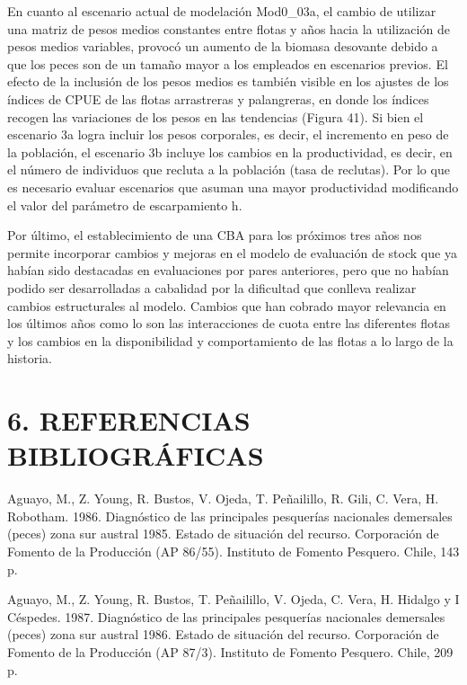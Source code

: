 \documentclass[
  spanish,
]{article}
\begin{document}
En cuanto al escenario actual de modelación Mod0\_03a, el cambio de
utilizar una matriz de pesos medios constantes entre flotas y años hacia
la utilización de pesos medios variables, provocó un aumento de la
biomasa desovante debido a que los peces son de un tamaño mayor a los
empleados en escenarios previos. El efecto de la inclusión de los pesos
medios es también visible en los ajustes de los índices de CPUE de las
flotas arrastreras y palangreras, en donde los índices recogen las
variaciones de los pesos en las tendencias (Figura 41). Si bien el
escenario 3a logra incluir los pesos corporales, es decir, el incremento
en peso de la población, el escenario 3b incluye los cambios en la
productividad, es decir, en el número de individuos que recluta a la
población (tasa de reclutas). Por lo que es necesario evaluar escenarios
que asuman una mayor productividad modificando el valor del parámetro de
escarpamiento h.

Por último, el establecimiento de una CBA para los próximos tres años
nos permite incorporar cambios y mejoras en el modelo de evaluación de
stock que ya habían sido destacadas en evaluaciones por pares
anteriores, pero que no habían podido ser desarrolladas a cabalidad por
la dificultad que conlleva realizar cambios estructurales al modelo.
Cambios que han cobrado mayor relevancia en los últimos años como lo son
las interacciones de cuota entre las diferentes flotas y los cambios en
la disponibilidad y comportamiento de las flotas a lo largo de la
historia.\\
\pagebreak

\hypertarget{referencias-bibliogruxe1ficas}{%
\section{6. REFERENCIAS
BIBLIOGRÁFICAS}\label{referencias-bibliogruxe1ficas}}

Aguayo, M., Z. Young, R. Bustos, V. Ojeda, T. Peñailillo, R. Gili, C.
Vera, H. Robotham. 1986. Diagnóstico de las principales pesquerías
nacionales demersales (peces) zona sur austral 1985. Estado de situación
del recurso. Corporación de Fomento de la Producción (AP 86/55).
Instituto de Fomento Pesquero. Chile, 143 p.~

Aguayo, M., Z. Young, R. Bustos, T. Peñailillo, V. Ojeda, C. Vera, H.
Hidalgo y I Céspedes. 1987. Diagnóstico de las principales pesquerías
nacionales demersales (peces) zona sur austral 1986. Estado de situación
del recurso. Corporación de Fomento de la Producción (AP 87/3).
Instituto de Fomento Pesquero. Chile, 209 p.~
\end{document}

